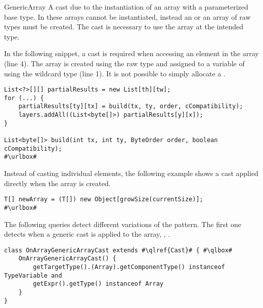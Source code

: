 \begin{pattern}{GenericArray}
A cast due to the instantiation of an array with a parameterized base type.
In \java{} these arrays cannot be instantiated,
instead an  or an array of raw types must be created.
The cast is necessary to use the array at the intended type. 

\instances{}
In the following snippet,
a cast is required when accessing an element in the array (line 4).
The array is created using the raw type 
and assigned to a variable of using the wildcard type  (line 1).
It is not possible to simply allocate a .

\def\urlvar{http://bit.ly/ppiastucki_recast4j_2EM7zWK}
\begin{verbatim}
List<?>[][] partialResults = new List[th][tw];
for (...) {
    partialResults[ty][tx] = build(tx, ty, order, cCompatibility);
    layers.addAll((List<byte[]>) partialResults[y][x]);
}

List<byte[]> build(int tx, int ty, ByteOrder order, boolean cCompatibility);
#\urlbox#
\end{verbatim}

Instead of casting individual elements,
the following example shows a cast applied directly when the array is created. 

\def\urlvar{http://bit.ly/seven332_Nimingban_2UdBwIL}
\begin{verbatim}
T[] newArray = (T[]) new Object[growSize(currentSize)];
#\urlbox#
\end{verbatim}


\detection{}
The following queries detect different variations of the \thisp{} pattern.
The first one detects when a generic cast is applied to the array,
\eg{}, .

\begin{listing}
\begin{verbatim}
class OnArrayGenericArrayCast extends #\qlref{Cast}# { #\qlbox#
	OnArrayGenericArrayCast() {
		getTargetType().(Array).getComponentType() instanceof TypeVariable and
		getExpr().getType() instanceof Array
	}
}
\end{verbatim}
\end{listing}


\end{pattern}
